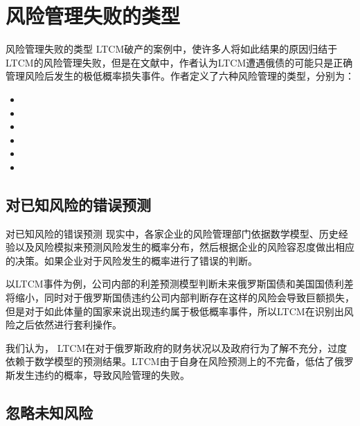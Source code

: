 \section{风险管理失败的类型}

\begin{frame}{风险管理失败的类型}
    LTCM破产的案例中，使许多人将如此结果的原因归结于LTCM的风险管理失败，但是在文献中，作者认为LTCM遭遇俄债的可能只是正确管理风险后发生的极低概率损失事件。作者定义了六种风险管理的类型，分别为：
    \begin{itemize}
        \item {}
        \item {}
        \item {}
        \item {}
        \item {}
        \item {}
    \end{itemize} 
\end{frame}

\subsection{对已知风险的错误预测}\label{sec:1}

\begin{frame}{对已知风险的错误预测}
    现实中，各家企业的风险管理部门依据数学模型、历史经验以及风险模拟来预测风险发生的概率分布，然后根据企业的风险容忍度做出相应的决策。如果企业对于风险发生的概率进行了错误的判断。
    
    以LTCM事件为例，公司内部的利差预测模型判断未来俄罗斯国债和美国国债利差将缩小，同时对于俄罗斯国债违约公司内部判断存在这样的风险会导致巨额损失，但是对于如此体量的国家来说出现违约属于极低概率事件，所以LTCM在识别出风险之后依然进行套利操作。
    
    我们认为， LTCM在对于俄罗斯政府的财务状况以及政府行为了解不充分，过度依赖于数学模型的预测结果。LTCM由于自身在风险预测上的不完备，低估了俄罗斯发生违约的概率，导致风险管理的失败。
\end{frame}

\subsection{忽略未知风险}\label{sec:2}


